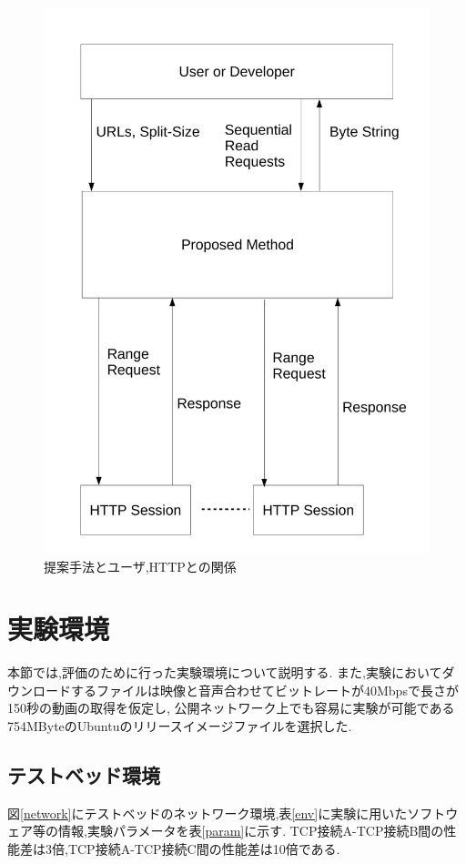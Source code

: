 \documentclass[a4j,12pt]{gradthesis_utf8}
\begin{document}
\begin{figure}[h]
	\label{sphttp}
	\begin{center}
		\includegraphics[width=15cm]{figure/sphttp.pdf}
		\caption{提案手法とユーザ,HTTPとの関係}
	\end{center}
\end{figure}

\clearpage

\section{実験環境}
本節では,評価のために行った実験環境について説明する.
また,実験においてダウンロードするファイルは映像と音声合わせてビットレートが40Mbpsで長さが150秒の動画の取得を仮定し,
公開ネットワーク上でも容易に実験が可能である754MByteのUbuntuのリリースイメージファイルを選択した.

\subsection{テストベッド環境}
\label{testbed}
図\ref{network}にテストベッドのネットワーク環境,表\ref{env}に実験に用いたソフトウェア等の情報,実験パラメータを表\ref{param}に示す.
TCP接続A-TCP接続B間の性能差は3倍,TCP接続A-TCP接続C間の性能差は10倍である.
\end{document}
